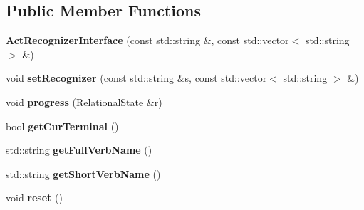 \subsection*{Public Member Functions}
\begin{DoxyCompactItemize}
\item 
\hypertarget{classCartWheel_1_1ActRecognizerInterface_ae1f3de563a599a96d5e15dc31e85e3b4}{
{\bfseries ActRecognizerInterface} (const std::string \&, const std::vector$<$ std::string $>$ \&)}
\label{classCartWheel_1_1ActRecognizerInterface_ae1f3de563a599a96d5e15dc31e85e3b4}

\item 
\hypertarget{classCartWheel_1_1ActRecognizerInterface_a19e2aaca7f4c38d6685f06a912379302}{
void {\bfseries setRecognizer} (const std::string \&s, const std::vector$<$ std::string $>$ \&)}
\label{classCartWheel_1_1ActRecognizerInterface_a19e2aaca7f4c38d6685f06a912379302}

\item 
\hypertarget{classCartWheel_1_1ActRecognizerInterface_af1a5d539c95a14e3aa217bcff3e1ac88}{
void {\bfseries progress} (\hyperlink{classCartWheel_1_1RelationalState}{RelationalState} \&r)}
\label{classCartWheel_1_1ActRecognizerInterface_af1a5d539c95a14e3aa217bcff3e1ac88}

\item 
\hypertarget{classCartWheel_1_1ActRecognizerInterface_ab7e700a977517832069f5dedd5d974ea}{
bool {\bfseries getCurTerminal} ()}
\label{classCartWheel_1_1ActRecognizerInterface_ab7e700a977517832069f5dedd5d974ea}

\item 
\hypertarget{classCartWheel_1_1ActRecognizerInterface_a17835b69c215fd9d59856fd142944459}{
std::string {\bfseries getFullVerbName} ()}
\label{classCartWheel_1_1ActRecognizerInterface_a17835b69c215fd9d59856fd142944459}

\item 
\hypertarget{classCartWheel_1_1ActRecognizerInterface_af80adb1c0c2f3865f3b4a9ed5e0f6de7}{
std::string {\bfseries getShortVerbName} ()}
\label{classCartWheel_1_1ActRecognizerInterface_af80adb1c0c2f3865f3b4a9ed5e0f6de7}

\item 
\hypertarget{classCartWheel_1_1ActRecognizerInterface_a177fbac4b830ef4fb8864dde5c523a6b}{
void {\bfseries reset} ()}
\label{classCartWheel_1_1ActRecognizerInterface_a177fbac4b830ef4fb8864dde5c523a6b}

\end{DoxyCompactItemize}
